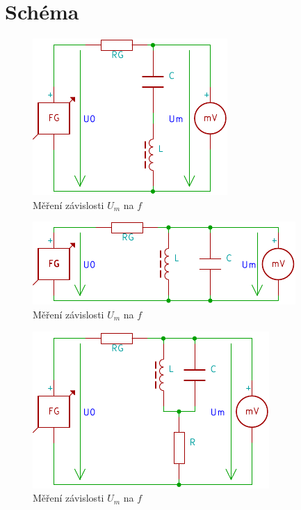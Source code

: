 \section{Schéma}
  \begin{figure}[H]
    \centering
    \includegraphics{../img/sch1.pdf}
    \caption{Měření závislosti $U_m$ na $f$}
    \label{sch:1}
  \end{figure}
  
  \begin{figure}[H]
    \centering
    \includegraphics{../img/sch2.pdf}
    \caption{Měření závislosti $U_m$ na $f$}
    \label{sch:2}
  \end{figure}
  
  \begin{figure}[H]
    \centering
    \includegraphics{../img/sch3.pdf}
    \caption{Měření závislosti $U_m$ na $f$}
    \label{sch:3}
  \end{figure}

